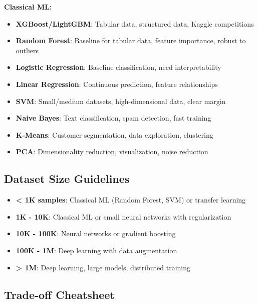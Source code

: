\documentclass[10pt]{article}
\begin{document}
\textbf{Classical ML:}
\begin{itemize}
\item \textbf{XGBoost/LightGBM}: Tabular data, structured data, Kaggle competitions
\item \textbf{Random Forest}: Baseline for tabular data, feature importance, robust to outliers
\item \textbf{Logistic Regression}: Baseline classification, need interpretability
\item \textbf{Linear Regression}: Continuous prediction, feature relationships
\item \textbf{SVM}: Small/medium datasets, high-dimensional data, clear margin
\item \textbf{Naive Bayes}: Text classification, spam detection, fast training
\item \textbf{K-Means}: Customer segmentation, data exploration, clustering
\item \textbf{PCA}: Dimensionality reduction, visualization, noise reduction
\end{itemize}

\subsection{Dataset Size Guidelines}

\begin{itemize}
\item \textbf{< 1K samples}: Classical ML (Random Forest, SVM) or transfer learning
\item \textbf{1K - 10K}: Classical ML or small neural networks with regularization
\item \textbf{10K - 100K}: Neural networks or gradient boosting
\item \textbf{100K - 1M}: Deep learning with data augmentation
\item \textbf{> 1M}: Deep learning, large models, distributed training
\end{itemize}

\subsection{Trade-off Cheatsheet}
\end{document}
